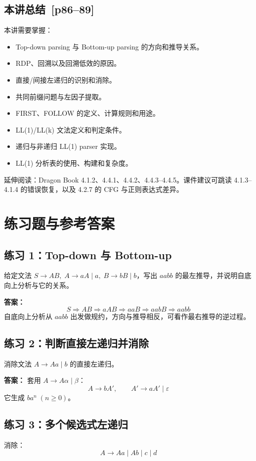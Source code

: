 \documentclass[UTF8,fontset=none,11pt]{ctexart}
\newcommand{\pg}[1]{\texorpdfstring{{\small\color{graytext}\,[p#1]}}{ [p#1]}}
\newcommand{\eps}{\varepsilon}
\begin{document}
\subsection{本讲总结 \pg{86--89}}
本讲需要掌握：
\begin{itemize}
  \item Top-down parsing 与 Bottom-up parsing 的方向和推导关系。
  \item RDP、回溯以及回溯低效的原因。
  \item 直接/间接左递归的识别和消除。
  \item 共同前缀问题与左因子提取。
  \item FIRST、FOLLOW 的定义、计算规则和用途。
  \item LL(1)/LL(k) 文法定义和判定条件。
  \item 递归与非递归 LL(1) parser 实现。
  \item LL(1) 分析表的使用、构建和复杂度。
\end{itemize}

延伸阅读：Dragon Book 4.1.2、4.4.1、4.4.2、4.4.3--4.4.5。课件建议可跳读 4.1.3--4.1.4 的错误恢复，以及 4.2.7 的 CFG 与正则表达式差异。

\section{练习题与参考答案}

\subsection*{练习 1：Top-down 与 Bottom-up}
给定文法 \(S\to AB,\;A\to aA\mid a,\;B\to bB\mid b\)，写出 \(aabb\) 的最左推导，并说明自底向上分析与它的关系。

\textbf{答案：}
\[
S\Rightarrow AB\Rightarrow aAB\Rightarrow aaB\Rightarrow aabB\Rightarrow aabb
\]
自底向上分析从 \(aabb\) 出发做规约，方向与推导相反，可看作最右推导的逆过程。

\subsection*{练习 2：判断直接左递归并消除}
消除文法 \(A\to Aa\mid b\) 的直接左递归。

\textbf{答案：}
套用 \(A\to A\alpha\mid\beta\)：
\[
A\to bA',\qquad A'\to aA'\mid\eps
\]
它生成 \(ba^n\;(n\ge 0)\)。

\subsection*{练习 3：多个候选式左递归}
消除：
\[
A\to Aa\mid Ab\mid c\mid d
\]
\end{document}
